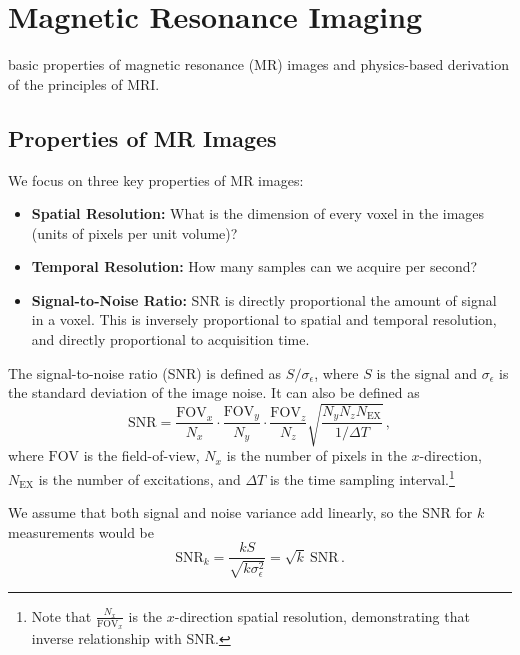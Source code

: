\chapter{Magnetic Resonance Imaging}

 basic properties of magnetic resonance (MR) images and physics-based derivation of the principles of MRI.

\section{Properties of MR Images}

We focus on three key properties of MR images:

\begin{itemize}
    \item \textbf{Spatial Resolution:} What is the dimension of every voxel in the images (units of pixels per unit volume)?
    \item \textbf{Temporal Resolution:} How many samples can we acquire per second?
    \item \textbf{Signal-to-Noise Ratio:} SNR is directly proportional the amount of signal in a voxel. This is inversely proportional to spatial and temporal resolution, and directly proportional to acquisition time.
\end{itemize}

\begin{defn}[SNR]
The signal-to-noise ratio (SNR) is defined as $S / \sigma_\epsilon$, where $S$ is the signal and $\sigma_\epsilon$ is the standard deviation of the image noise.
It can also be defined as
\begin{equation}
    \text{SNR} = \frac{\text{FOV}_x}{N_x} \cdot \frac{\text{FOV}_y}{N_y} \cdot \frac{\text{FOV}_z}{N_z} \sqrt{\frac{N_y N_z N_\text{EX}}{1 / \Delta T}} \,,
\end{equation}
where $\text{FOV}$ is the field-of-view, $N_x$ is the number of pixels in the $x$-direction, $N_\text{EX}$ is the number of excitations, and $\Delta T$ is the time sampling interval.\footnote{Note that $\frac{N_x}{\text{FOV}_x}$ is the $x$-direction spatial resolution, demonstrating that inverse relationship with SNR.}
\end{defn}

\begin{remark}
We assume that both signal and noise variance add linearly, so the SNR for $k$ measurements would be
\begin{equation}
    \text{SNR}_k = \frac{kS}{\sqrt{k\sigma^2_\epsilon}} = \sqrt k ~\text{SNR} \,.
\end{equation}
\end{remark}

